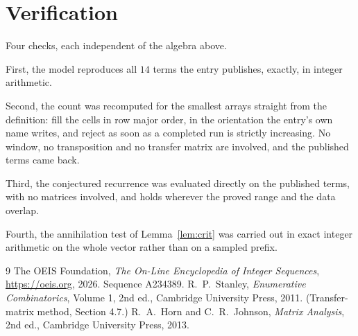 \documentclass[11pt,a4paper]{article}
\theoremstyle{plain}
\theoremstyle{definition}
\begin{document}
\section{Verification}

Four checks, each independent of the algebra above.

First, the model reproduces all $14$ terms the entry publishes, exactly, in integer
arithmetic.

Second, the count was recomputed for the smallest arrays straight from the definition: fill the
cells in row major order, in the orientation the entry's own name writes, and reject as soon as
a completed run is strictly increasing. No window, no transposition and no transfer matrix are involved, and
the published terms came back.

Third, the conjectured recurrence was evaluated directly on the published terms, with no
matrices involved, and holds wherever the proved range and the data overlap.

Fourth, the annihilation test of Lemma~\ref{lem:crit} was carried out in exact integer
arithmetic on the whole vector rather than on a sampled prefix.

\begin{thebibliography}{9}
 The OEIS Foundation, \emph{The On-Line Encyclopedia of Integer
Sequences}, \url{https://oeis.org}, 2026. Sequence A234389.
 R.~P.~Stanley, \emph{Enumerative Combinatorics}, Volume 1, 2nd ed.,
Cambridge University Press, 2011. (Transfer-matrix method, Section 4.7.)
 R.~A.~Horn and C.~R.~Johnson, \emph{Matrix Analysis}, 2nd ed., Cambridge
University Press, 2013.
\end{thebibliography}
\end{document}
